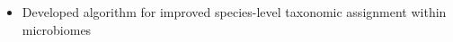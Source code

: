 \documentclass[letterpaper,10pt]{article}
\begin{document}
\begin{itemize}
\begin{itemize}


			\item Developed algorithm for improved species-level taxonomic assignment within microbiomes


\end{itemize}
\end{itemize}
\end{document}
